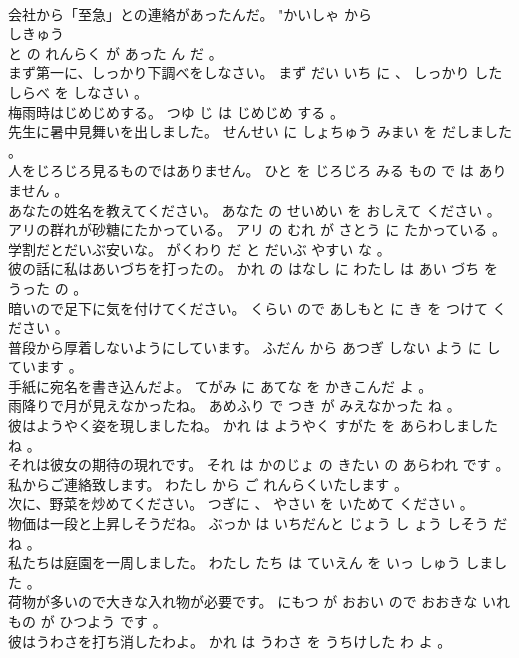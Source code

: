 \documentclass[8pt]{extreport}
\begin{document}
\begin{CJK}{UTF8}{min}
\\	会社から「至急」との連絡があったんだ。	"かいしゃ から 
\\	しきゅう 
\\	と の れんらく が あった ん だ 。 
\\	まず第一に、しっかり下調べをしなさい。	まず だい いち に 、 しっかり したしらべ を しなさい 。 
\\	梅雨時はじめじめする。	つゆ じ は じめじめ する 。 
\\	先生に暑中見舞いを出しました。	せんせい に しょちゅう みまい を だしました 。 
\\	人をじろじろ見るものではありません。	ひと を じろじろ みる もの で は ありません 。 
\\	あなたの姓名を教えてください。	あなた の せいめい を おしえて ください 。 
\\	アリの群れが砂糖にたかっている。	アリ の むれ が さとう に たかっている 。 
\\	学割だとだいぶ安いな。	がくわり だ と だいぶ やすい な 。 
\\	彼の話に私はあいづちを打ったの。	かれ の はなし に わたし は あい づち を うった の 。 
\\	暗いので足下に気を付けてください。	くらい ので あしもと に き を つけて ください 。 
\\	普段から厚着しないようにしています。	ふだん から あつぎ しない よう に しています 。 
\\	手紙に宛名を書き込んだよ。	てがみ に あてな を かきこんだ よ 。 
\\	雨降りで月が見えなかったね。	あめふり で つき が みえなかった ね 。 
\\	彼はようやく姿を現しましたね。	かれ は ようやく すがた を あらわしました ね 。 
\\	それは彼女の期待の現れです。	それ は かのじょ の きたい の あらわれ です 。 
\\	私からご連絡致します。	わたし から ご れんらくいたします 。 
\\	次に、野菜を炒めてください。	つぎに 、 やさい を いためて ください 。 
\\	物価は一段と上昇しそうだね。	ぶっか は いちだんと じょう し ょう しそう だ ね 。 
\\	私たちは庭園を一周しました。	わたし たち は ていえん を いっ しゅう しました 。 
\\	荷物が多いので大きな入れ物が必要です。	にもつ が おおい ので おおきな いれもの が ひつよう です 。 
\\	彼はうわさを打ち消したわよ。	かれ は うわさ を うちけした わ よ 。 

\end{CJK}
\end{document}
